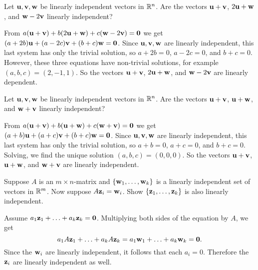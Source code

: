 \begin{ex}
  Let $\vect{u},\vect{v},\vect{w}$ be linearly independent vectors in
  $\mathbb{R}^n$. Are the vectors $\vect{u}+\vect{v}$, $2\vect{u}+\vect{w}$,
  and $\vect{w}-2\vect{v}$ linearly independent?
  \begin{sol}
    From
    $a(\vect{u}+\vect{v}) + b(2\vect{u}+\vect{w}) +
    c(\vect{w}-2\vect{v})=\vect{0}$ we get
    $(a+2b)\vect{u} + (a-2c)\vect{v} + (b+c)\vect{w}=\vect{0}$.  Since
    $\vect{u},\vect{v},\vect{w}$ are linearly independent, this last
    system has only the trivial solution, so $a+2b=0$, $a-2c=0$, and
    $b+c=0$. However, these three equations have non-trivial
    solutions, for example $(a,b,c)=(2,-1,1)$. So the vectors
    $\vect{u}+\vect{v}$, $2\vect{u}+\vect{w}$, and
    $\vect{w}-2\vect{v}$ are linearly dependent.
  \end{sol}
\end{ex}

\begin{ex}
  Let $\vect{u},\vect{v},\vect{w}$ be linearly independent vectors in
  $\mathbb{R}^n$. Are the vectors $\vect{u}+\vect{v}$, $\vect{u}+\vect{w}$,
  and $\vect{w}+\vect{v}$ linearly independent?
  \begin{sol}
    From
    $a(\vect{u}+\vect{v}) + b(\vect{u}+\vect{w}) +
    c(\vect{w}+\vect{v})=\vect{0}$ we get
    $(a+b)\vect{u} + (a+c)\vect{v} + (b+c)\vect{w}=\vect{0}$.  Since
    $\vect{u},\vect{v},\vect{w}$ are linearly independent, this last
    system has only the trivial solution, so $a+b=0$, $a+c=0$, and
    $b+c=0$. Solving, we find the unique solution
    $(a,b,c)=(0,0,0)$. So the vectors $\vect{u}+\vect{v}$,
    $\vect{u}+\vect{w}$, and $\vect{w}+\vect{v}$ are linearly
    independent.
  \end{sol}
\end{ex}

\begin{ex}
  Suppose $A$ is an $m\times n$-matrix and
  $\set{\vect{w} _{1},\ldots,\vect{w}_{k}}$ is a linearly independent
  set of vectors in $\mathbb{R}^m$. Now suppose
  $A\vect{z}_{i}=\vect{w}_{i}$. Show
  $\set{ \vect{z}_{1},\ldots,\vect{z}_{k}}$ is also linearly
  independent.
  \begin{sol}
    Assume
    $a_{1}\vect{z}_{1}+\ldots+a_{k}\vect{z}_{k}=\vect{0}$. Multiplying
    both sides of the equation by $A$, we get
    \begin{equation*}
      a_{1}A\vect{z}_{1}+\ldots+a_{k}A\vect{z}_{k}=
      a_{1}\vect{w}_{1}+\ldots+a_{k}\vect{w}_{k}=\vect{0}.
    \end{equation*}
    Since the $\vect{w}_{i}$ are linearly independent, it follows that
    each $a_{i}=0$. Therefore the $\vect{z}_{i}$ are linearly
    independent as well.
  \end{sol}
\end{ex}

